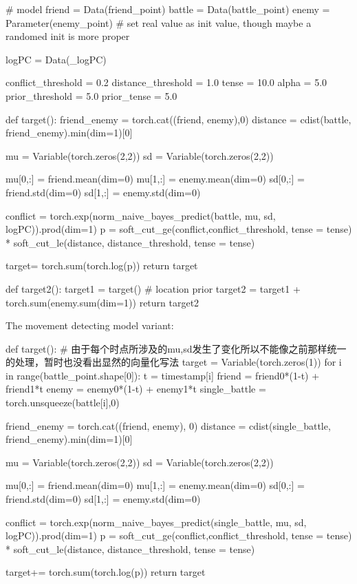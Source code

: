 \documentclass{article}
\begin{document}
\begin{python}

# model
friend = Data(friend_point)
battle = Data(battle_point)
enemy = Parameter(enemy_point) # set real value as init value, though maybe a randomed init is more proper

logPC = Data(_logPC)

conflict_threshold = 0.2
distance_threshold = 1.0
tense = 10.0
alpha = 5.0
prior_threshold = 5.0
prior_tense = 5.0

def target():
    friend_enemy = torch.cat((friend, enemy),0)
    distance = cdist(battle, friend_enemy).min(dim=1)[0]
    

    mu = Variable(torch.zeros(2,2)) 
    sd = Variable(torch.zeros(2,2))
    
    mu[0,:] = friend.mean(dim=0)
    mu[1,:] = enemy.mean(dim=0)
    sd[0,:] = friend.std(dim=0)
    sd[1,:] = enemy.std(dim=0)
    
    conflict = torch.exp(norm_naive_bayes_predict(battle, mu, sd, logPC)).prod(dim=1)
    p = soft_cut_ge(conflict,conflict_threshold, tense = tense) * soft_cut_le(distance, distance_threshold, tense = tense)
    
    target= torch.sum(torch.log(p))
    return target

def target2():
    target1 = target()
    # location prior
    target2 = target1 + torch.sum(enemy.sum(dim=1))
    return target2

\end{python}

The movement detecting model variant:

\begin{python}
def target():
    # 由于每个时点所涉及的mu,sd发生了变化所以不能像之前那样统一的处理，暂时也没看出显然的向量化写法
    target = Variable(torch.zeros(1))
    for i in range(battle_point.shape[0]):
        t = timestamp[i]
        friend = friend0*(1-t) + friend1*t
        enemy = enemy0*(1-t) + enemy1*t
        single_battle = torch.unsqueeze(battle[i],0) 
        
        friend_enemy = torch.cat((friend, enemy), 0)
        distance = cdist(single_battle, friend_enemy).min(dim=1)[0]
        
        mu = Variable(torch.zeros(2,2)) 
        sd = Variable(torch.zeros(2,2))

        mu[0,:] = friend.mean(dim=0)
        mu[1,:] = enemy.mean(dim=0)
        sd[0,:] = friend.std(dim=0)
        sd[1,:] = enemy.std(dim=0)

        conflict = torch.exp(norm_naive_bayes_predict(single_battle, mu, sd, logPC)).prod(dim=1)
        p = soft_cut_ge(conflict,conflict_threshold, tense = tense) * soft_cut_le(distance, distance_threshold, tense = tense)

        target+= torch.sum(torch.log(p))
    return target

\end{python}
\end{document}
